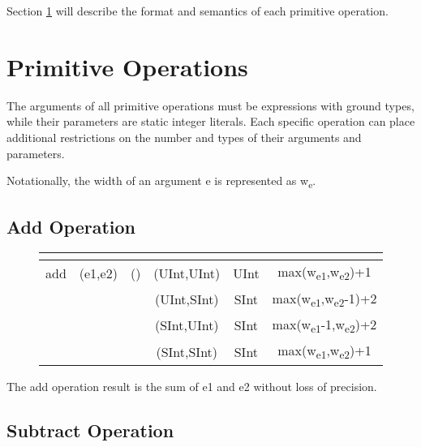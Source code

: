 \documentclass[12pt]{article}
\begin{document}
Section \ref{primitives} will describe the format and semantics of each primitive operation.

\section{Primitive Operations} \label{primitives}

\newcommand{\vv}[1]{{\ttfamily #1}}
\newcommand{\ts}[1]{\textsubscript{#1}}
\newcommand{\nf}[1]{\normalfont{\textbf{#1}}}
\newcommand{\opheader}{
 \hline
    \multicolumn{1}{|c|}{\nf{Name}} 
  & \multicolumn{1}{c|}{\nf{Arguments}}
  & \multicolumn{1}{c|}{\nf{Parameters}}
  & \multicolumn{1}{c|}{\nf{Arg Types}}
  & \multicolumn{1}{c|}{\nf{Result Type}}
  & \multicolumn{1}{c|}{\nf{Result Width}}\\
\hline  
}

The arguments of all primitive operations must be expressions with ground types, while their parameters are static integer literals. Each specific operation can place additional restrictions on the number and types of their arguments and parameters.

Notationally, the width of an argument \vv{e} is represented as \vv{w}\ts{e}.

\subsection{Add Operation}

\begin{figure}[H]
{ \fontsize{10pt}{1.10em}\selectfont
{\ttfamily
\begin{tabular}{ |c|c|c|c|c|c| }   
  \opheader 
add & (e1,e2) & () & (UInt,UInt) & UInt & max(w\ts{e1},w\ts{e2})+1\\
                 &&& (UInt,SInt) & SInt & max(w\ts{e1},w\ts{e2}-1)+2\\
                 &&& (SInt,UInt) & SInt & max(w\ts{e1}-1,w\ts{e2})+2\\
                 &&& (SInt,SInt) & SInt & max(w\ts{e1},w\ts{e2})+1\\
 \hline
\end{tabular}
}}
\end{figure}
The add operation result is the sum of \vv{e1} and \vv{e2} without loss of precision.

\subsection{Subtract Operation}
\end{document}
